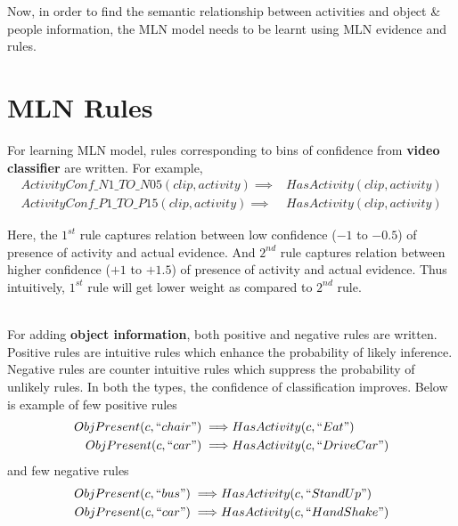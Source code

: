 Now, in order to find the semantic relationship between activities and object \& people information,
the MLN model needs to be learnt using MLN evidence and rules.




\section{MLN Rules}
For learning MLN model, rules corresponding to bins of confidence
from {\bf video classifier} are written.
For example,
\begin{equation}
	\begin{split}
		ActivityConf\_N1\_TO\_N05(clip,activity) \implies & HasActivity(clip,activity) \\
		ActivityConf\_P1\_TO\_P15(clip,activity) \implies & HasActivity(clip,activity)
	\end{split}
\end{equation}

Here, the $1^{st}$ rule captures relation between low confidence ($-1$ to $-0.5$) of presence
of activity and actual evidence. And $2^{nd}$ rule captures relation between
higher confidence ($+1$ to $+1.5$) of presence of activity and actual evidence.
Thus intuitively, $1^{st}$ rule will get lower weight as compared to $2^{nd}$ rule.

~ \\
For adding {\bf object information}, both positive and negative rules are written.
Positive rules are intuitive rules which enhance the probability of likely
inference. Negative rules are counter intuitive rules which suppress the
probability of unlikely rules. In both the types, the confidence of classification
improves. Below is example of few positive rules
\begin{equation}
	\begin{split}
		ObjPresent(c,``chair") \implies & HasActivity(c,``Eat") \\
		ObjPresent(c,``car") \implies & HasActivity(c,``DriveCar")
	\end{split}
\end{equation}
and few negative rules
\begin{equation}
	\begin{split}
		ObjPresent(c,``bus") \implies & HasActivity(c,``StandUp") \\
		ObjPresent(c,``car") \implies & HasActivity(c,``HandShake")
	\end{split}
\end{equation}

